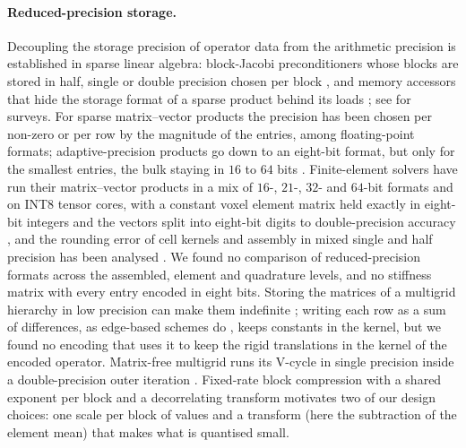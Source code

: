 \documentclass[sigconf,balance=false]{acmart}
\begin{document}
\paragraph{Reduced-precision storage.}  Decoupling the storage precision of operator data from the
arithmetic precision is established in sparse linear algebra: block-Jacobi preconditioners whose
blocks are stored in half, single or double precision chosen per block \cite{Anzt2019}, and memory
accessors that hide the storage format of a sparse product behind its loads
\cite{Gruetzmacher2023}; see \cite{HighamMary2022,Abdelfattah2021} for surveys.  For sparse
matrix--vector products the precision has been chosen per non-zero \cite{Ahmad2019} or per row
\cite{Tezcan2022} by the magnitude of the entries, among floating-point formats; adaptive-precision
products go down to an eight-bit format, but only for the smallest entries, the bulk staying in $16$
to $64$ bits \cite{Graillat2024}.  Finite-element solvers have run their matrix--vector products in a
mix of $16$-, $21$-, $32$- and $64$-bit formats \cite{Ichimura2018} and on INT8 tensor cores, with a
constant voxel element matrix held exactly in eight-bit integers and the vectors split into
eight-bit digits to double-precision accuracy \cite{Ichimura2024}, and the rounding error of cell
kernels and assembly in mixed single and half precision has been analysed
\cite{CrociWells2024}.  We found no comparison of reduced-precision formats across the assembled,
element and quadrature levels, and no stiffness matrix with every entry encoded in eight bits.
Storing the matrices of a multigrid hierarchy in low precision can make them indefinite
\cite{Tamstorf2021}; writing each row as a sum of differences, as edge-based schemes do
\cite{Lohner2008}, keeps constants in the kernel, but we found no encoding that uses it to keep the
rigid translations in the kernel of the encoded operator.  Matrix-free
multigrid runs its V-cycle in single precision inside a double-precision outer iteration
\cite{KronbichlerLjungkvist2019}.  Fixed-rate block compression with a shared exponent per block
and a decorrelating transform \cite{Lindstrom2014} motivates two of our design choices: one scale
per block of values and a transform (here the subtraction of the element mean) that makes what is
quantised small.
\end{document}
